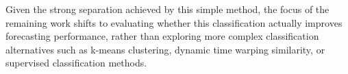 Given the strong separation achieved by this simple method, the focus of the remaining work shifts to evaluating whether this classification actually improves forecasting performance, rather than exploring more complex classification alternatives such as k-means clustering, dynamic time warping similarity, or supervised classification methods. \\